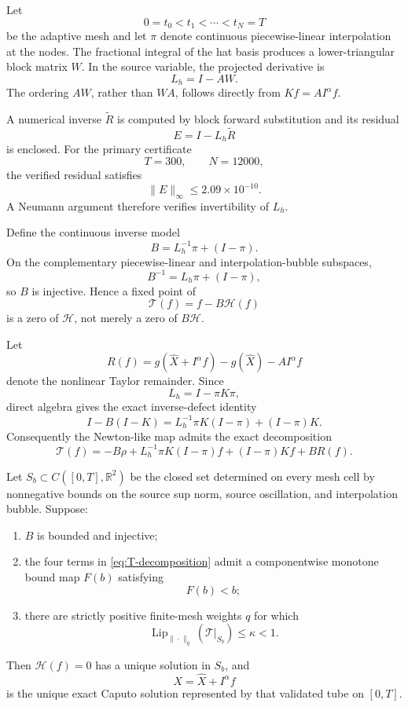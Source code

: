 Let
\[
  0=t_0<t_1<\cdots<t_N=T
\]
be the adaptive mesh and let \(\pi\) denote continuous piecewise-linear interpolation at the nodes. The fractional integral of the hat basis produces a lower-triangular block matrix \(W\). In the source variable, the projected derivative is
\begin{equation}
  L_h=I-AW.
  \label{eq:source-discrete-operator}
\end{equation}
The ordering \(AW\), rather than \(WA\), follows directly from \(Kf=A I^\alpha f\).

A numerical inverse \(\widetilde R\) is computed by block forward substitution and its residual
\[
  E=I-L_h\widetilde R
\]
is enclosed. For the primary certificate
\[
  T=300,
  \qquad
  N=12000,
\]
the verified residual satisfies
\begin{equation}
  \|E\|_\infty
  \le
  2.09\times10^{-10}.
  \label{eq:inverse-residual}
\end{equation}
A Neumann argument therefore verifies invertibility of \(L_h\).

Define the continuous inverse model
\[
  B=L_h^{-1}\pi+(I-\pi).
\]
On the complementary piecewise-linear and interpolation-bubble subspaces,
\[
  B^{-1}=L_h\pi+(I-\pi),
\]
so \(B\) is injective. Hence a fixed point of
\[
  \mathcal T(f)=f-B\mathcal H(f)
\]
is a zero of \(\mathcal H\), not merely a zero of \(B\mathcal H\).

Let
\[
  R(f)
  =
  g(\widehat X+I^\alpha f)-g(\widehat X)-A I^\alpha f
\]
denote the nonlinear Taylor remainder. Since
\[
  L_h=I-\pi K\pi,
\]
direct algebra gives the exact inverse-defect identity
\begin{equation}
  I-B(I-K)
  =
  L_h^{-1}\pi K(I-\pi)
  +(I-\pi)K.
  \label{eq:inverse-defect-identity}
\end{equation}
Consequently the Newton-like map admits the exact decomposition
\begin{equation}
  \mathcal T(f)
  =
  -B\rho
  +
  L_h^{-1}\pi K(I-\pi)f
  +
  (I-\pi)Kf
  +
  B R(f).
  \label{eq:T-decomposition}
\end{equation}

\begin{proposition}
\label{prop:cellwise-validation}
Let \(S_b\subset C([0,T],\mathbb R^2)\) be the closed set determined on every mesh cell by nonnegative bounds on the source sup norm, source oscillation, and interpolation bubble. Suppose:
\begin{enumerate}[label=(V\arabic*)]
  \item \(B\) is bounded and injective;
  \item the four terms in \eqref{eq:T-decomposition} admit a componentwise monotone bound map \(F(b)\) satisfying
  \[
    F(b)<b;
  \]
  \item there are strictly positive finite-mesh weights \(q\) for which
  \[
    \operatorname{Lip}_{\|\cdot\|_q}(\mathcal T|_{S_b})
    \le\kappa<1.
  \]
\end{enumerate}
Then \(\mathcal H(f)=0\) has a unique solution in \(S_b\), and
\[
  X=\widehat X+I^\alpha f
\]
is the unique exact Caputo solution represented by that validated tube on \([0,T]\).
\end{proposition}

